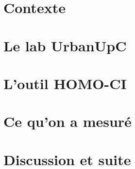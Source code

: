 \documentclass[11pt,a4paper,openright,twoside]{book}
\begin{document}
\frontmatter
{}


\cleardoublepage


\cleardoublepage


\cleardoublepage


\cleardoublepage

\setcounter{tocdepth}{2}
\tableofcontents
\cleardoublepage
\listoffigures
\cleardoublepage
\listoftables
\cleardoublepage


\cleardoublepage

\mainmatter
{}

\part{Contexte}



\part{Le lab UrbanUpC}




\part{L'outil HOMO-CI}



\part{Ce qu'on a mesuré}


\part{Discussion et suite}


\backmatter




\appendix



\end{document}
